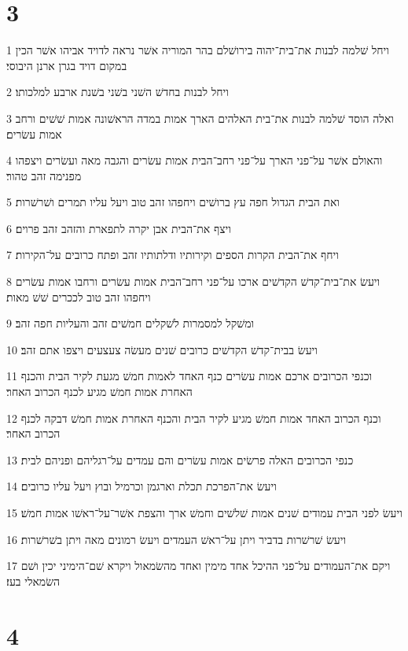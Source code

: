 \chapter{3}

\par 1 ויחל שׁלמה לבנות את־בית־יהוה בירושׁלם בהר המוריה אשׁר נראה לדויד אביהו אשׁר הכין במקום דויד בגרן ארנן היבוסי׃
\par 2 ויחל לבנות בחדשׁ השׁני בשׁני בשׁנת ארבע למלכותו׃
\par 3 ואלה הוסד שׁלמה לבנות את־בית האלהים הארך אמות במדה הראשׁונה אמות שׁשׁים ורחב אמות עשׂרים׃
\par 4 והאולם אשׁר על־פני הארך על־פני רחב־הבית אמות עשׂרים והגבה מאה ועשׂרים ויצפהו מפנימה זהב טהור׃
\par 5 ואת הבית הגדול חפה עץ ברושׁים ויחפהו זהב טוב ויעל עליו תמרים ושׁרשׁרות׃
\par 6 ויצף את־הבית אבן יקרה לתפארת והזהב זהב פרוים׃
\par 7 ויחף את־הבית הקרות הספים וקירותיו ודלתותיו זהב ופתח כרובים על־הקירות׃
\par 8 ויעשׂ את־בית־קדשׁ הקדשׁים ארכו על־פני רחב־הבית אמות עשׂרים ורחבו אמות עשׂרים ויחפהו זהב טוב לככרים שׁשׁ מאות׃
\par 9 ומשׁקל למסמרות לשׁקלים חמשׁים זהב והעליות חפה זהב׃
\par 10 ויעשׂ בבית־קדשׁ הקדשׁים כרובים שׁנים מעשׂה צעצעים ויצפו אתם זהב׃
\par 11 וכנפי הכרובים ארכם אמות עשׂרים כנף האחד לאמות חמשׁ מגעת לקיר הבית והכנף האחרת אמות חמשׁ מגיע לכנף הכרוב האחר׃
\par 12 וכנף הכרוב האחד אמות חמשׁ מגיע לקיר הבית והכנף האחרת אמות חמשׁ דבקה לכנף הכרוב האחר׃
\par 13 כנפי הכרובים האלה פרשׂים אמות עשׂרים והם עמדים על־רגליהם ופניהם לבית׃
\par 14 ויעשׂ את־הפרכת תכלת וארגמן וכרמיל ובוץ ויעל עליו כרובים׃
\par 15 ויעשׂ לפני הבית עמודים שׁנים אמות שׁלשׁים וחמשׁ ארך והצפת אשׁר־על־ראשׁו אמות חמשׁ׃
\par 16 ויעשׂ שׁרשׁרות בדביר ויתן על־ראשׁ העמדים ויעשׂ רמונים מאה ויתן בשׁרשׁרות׃
\par 17 ויקם את־העמודים על־פני ההיכל אחד מימין ואחד מהשׂמאול ויקרא שׁם־הימיני יכין ושׁם השׂמאלי בעז׃

\chapter{4}

